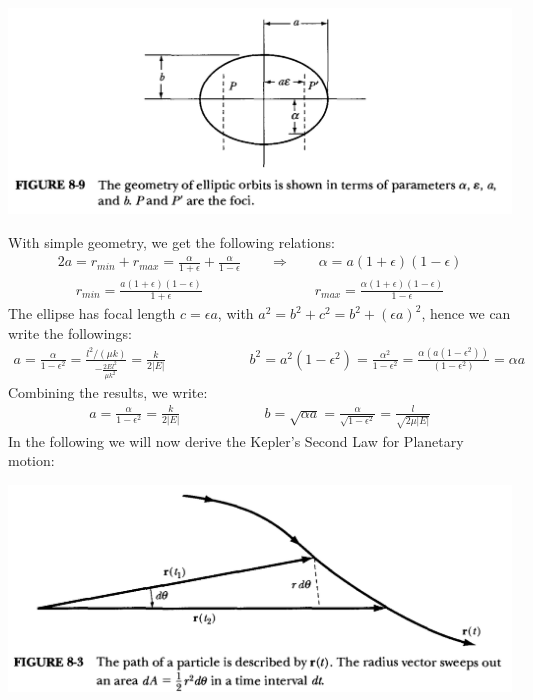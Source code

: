 \documentclass[11pt,oneside]{book}
\theoremstyle{break}
\theoremstyle{break}
\begin{document}
\begin{center}
\includegraphics[scale=0.39]{ellipse.png}
\end{center}
With simple geometry, we get the following relations:
\begin{align*}
2a = r_{min}+r_{max} = \frac{\alpha}{1+\epsilon} + \frac{\alpha}{1-\epsilon} \qquad\Rightarrow\qquad \alpha = a(1+\epsilon)(1-\epsilon)
\end{align*}
\begin{align*}
r_{min}=\frac{a(1+\epsilon)(1-\epsilon)}{1+\epsilon}\qquad\qquad\qquad\qquad r_{max} = \frac{\alpha(1+\epsilon)(1-\epsilon)}{1-\epsilon}
\end{align*}
The ellipse has focal length $c = \epsilon a$, with $a^2 = b^2 + c^2 = b^2 + (\epsilon a)^2$, hence we can write the followings:
\begin{align*}
a = \frac{\alpha}{1-\epsilon^2} = \frac{l^2/(\mu k)}{-\frac{2El^2}{\mu k^2}} = \frac{k}{2|E|} \qquad \qquad\qquad b^2 = a^2(1-\epsilon^2) =\frac{\alpha^2}{1-\epsilon^2}= \frac{\alpha(a(1-\epsilon^2))}{(1-\epsilon^2)} = \alpha a
\end{align*}
Combining the results, we write:
\begin{align*}
a = \frac{\alpha}{1-\epsilon^2} = \frac{k}{2|E|}\qquad\qquad\qquad b=\sqrt{\alpha a} = \frac{\alpha}{\sqrt{1-\epsilon^2}} = \frac{l}{\sqrt{2\mu|E| }}
\end{align*}
\newpage
In the following we will now derive the Kepler's Second Law for Planetary motion:
\begin{center}
\includegraphics[scale=0.50]{K2L.png}
\end{center}
\end{document}
